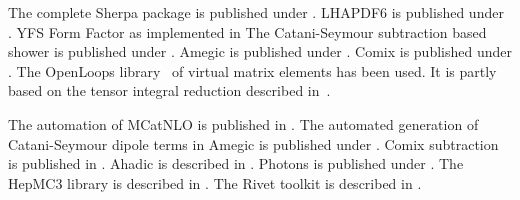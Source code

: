 \documentclass{article}
\begin{document}
The complete Sherpa package is published under \cite{Sherpa:2024mfk}.
LHAPDF6 is published under \cite{Buckley:2014ana}.
YFS Form Factor as implemented in \cite{Jadach:1999vf}
The Catani-Seymour subtraction based shower is published under \cite{Schumann:2007mg}.
Amegic is published under \cite{Krauss:2001iv}.
Comix is published under \cite{Gleisberg:2008fv}.
The OpenLoops library~\cite{Cascioli:2011va} of virtual
matrix elements has been used. 
It is partly based on the tensor integral reduction described 
in~\cite{Denner:2002ii,Denner:2005nn,Denner:2010tr}.

The automation of MCatNLO is published in \cite{Hoeche:2011fd}.
The automated generation of Catani-Seymour dipole terms in Amegic is published under \cite{Gleisberg:2007md}.
Comix subtraction is published in \cite{Hoeche:2012xx}.
Ahadic is described in \cite{Chahal:2022rid}.
Photons is published under \cite{Schonherr:2008av}.
The HepMC3 library is described in \cite{Buckley:2019xhk}.
The Rivet toolkit is described in \cite{Bierlich:2019rhm}.
\end{document}
